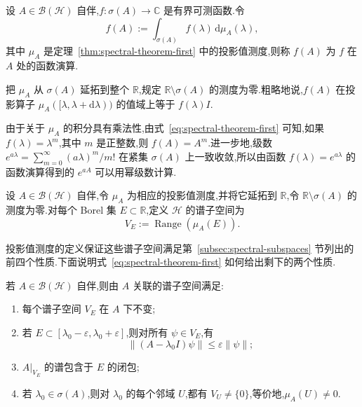 \begin{definition}[函数演算]\label{def:functional-calculus}
设 \(A\in\mathcal{B}(\mathcal{H})\) 自伴,\(f:\sigma(A)\to\mathbb{C}\) 是有界可测函数.令
\[
f(A):=\int_{\sigma(A)}f(\lambda)\,\mathrm{d}\mu_{A}(\lambda),
\label{eq:functional-calculus}
\]
其中 \(\mu_{A}\) 是定理~\ref{thm:spectral-theorem-first} 中的投影值测度,则称 \(f(A)\) 为 \(f\) 在 \(A\) 处的函数演算.
\end{definition}

把 \(\mu_{A}\) 从 \(\sigma(A)\) 延拓到整个 \(\mathbb{R}\),规定 \(\mathbb{R}\setminus\sigma(A)\) 的测度为零.粗略地说,\(f(A)\) 在投影算子 \(\mu_{A}([\lambda,\lambda+\mathrm{d}\lambda))\) 的值域上等于 \(f(\lambda)I\).

由于关于 \(\mu_{A}\) 的积分具有乘法性,由式~\eqref{eq:spectral-theorem-first} 可知,如果 \(f(\lambda)=\lambda^{m}\),其中 \(m\) 是正整数,则 \(f(A)=A^{m}\).进一步地,级数 \(e^{a\lambda}=\sum_{m=0}^{\infty}(a\lambda)^{m}/m!\) 在紧集 \(\sigma(A)\) 上一致收敛,所以由函数 \(f(\lambda)=e^{a\lambda}\) 的函数演算得到的 \(e^{aA}\) 可以用幂级数计算.

\begin{definition}[谱子空间]\label{def:spectral-subspace}
设 \(A\in\mathcal{B}(\mathcal{H})\) 自伴,令 \(\mu_{A}\) 为相应的投影值测度,并将它延拓到 \(\mathbb{R}\),令 \(\mathbb{R}\setminus\sigma(A)\) 的测度为零.对每个 Borel 集 \(E\subset\mathbb{R}\),定义 \(\mathcal{H}\) 的谱子空间为
\[
V_{E}:=\operatorname{Range}(\mu_{A}(E)).
\label{eq:spectral-subspace-definition}
\]
\end{definition}

投影值测度的定义保证这些谱子空间满足第~\ref{subsec:spectral-subspaces} 节列出的前四个性质.下面说明式~\eqref{eq:spectral-theorem-first} 如何给出剩下的两个性质.

\begin{proposition}[谱子空间的性质]\label{prop:spectral-subspace-properties}
若 \(A\in\mathcal{B}(\mathcal{H})\) 自伴,则由 \(A\) 关联的谱子空间满足:
\begin{enumerate}
\item 每个谱子空间 \(V_{E}\) 在 \(A\) 下不变;
\item 若 \(E\subset[\lambda_{0}-\varepsilon,\lambda_{0}+\varepsilon]\),则对所有 \(\psi\in V_{E}\),有
\[
\|(A-\lambda_{0}I)\psi\|\leq\varepsilon\|\psi\|;
\]
\item \(A|_{V_{E}}\) 的谱包含于 \(E\) 的闭包;
\item 若 \(\lambda_{0}\in\sigma(A)\),则对 \(\lambda_{0}\) 的每个邻域 \(U\),都有 \(V_{U}\neq\{0\}\),等价地,\(\mu_{A}(U)\neq0\).
\end{enumerate}
\end{proposition}

